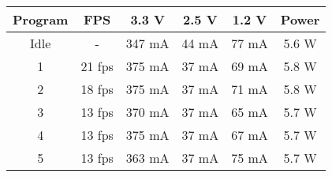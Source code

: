 \begin{table}[h!]
\centering
\begin{tabular}{c|c|ccc|c}
	\textbf{Program} &
        \textbf{FPS} &
        \textbf{3.3 V} &
        \textbf{2.5 V} &
        \textbf{1.2 V} &
        \textbf{Power} \\
	\hline
	Idle & - & 347 mA & 44 mA & 77 mA & 5.6 W \\
	1 & 21 fps & 375 mA & 37 mA & 69 mA & 5.8 W \\
        2 & 18 fps & 375 mA & 37 mA & 71 mA & 5.8 W \\
        3 & 13 fps & 370 mA & 37 mA & 65 mA & 5.7 W \\
        4 & 13 fps & 375 mA & 37 mA & 67 mA & 5.7 W \\
        5 & 13 fps & 363 mA & 37 mA & 75 mA & 5.7 W \\
\end{tabular}
\caption[]{}
\label{tab:lena-benchmark-table}
\end{table}
